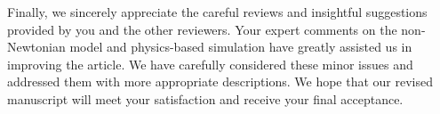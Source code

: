 \documentclass[12pt,a4paper]{article}
\begin{document}
\vspace{0.5cm}
Finally, we sincerely appreciate the careful reviews and insightful suggestions provided by you and the other reviewers. Your expert comments on the non-Newtonian model and physics-based simulation have greatly assisted us in improving the article. We have carefully considered these minor issues and addressed them with more appropriate descriptions. We hope that our revised manuscript will meet your satisfaction and receive your final acceptance. 



\newpage

\bigskip
\bigskip



\end{document}
